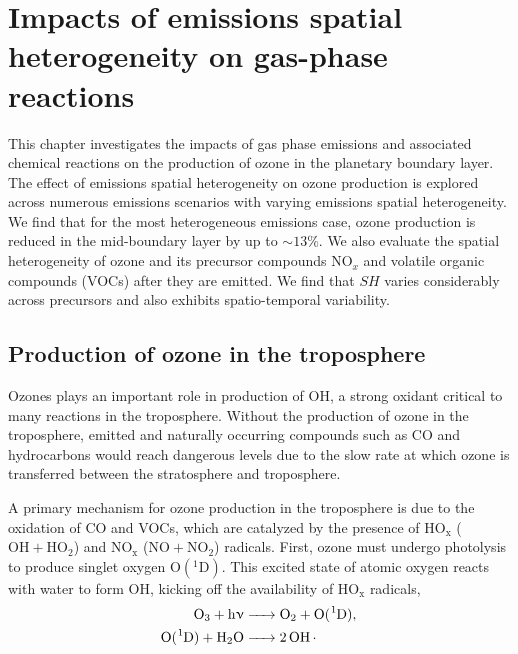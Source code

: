 \chapter{Impacts of emissions spatial heterogeneity on gas-phase reactions}

This chapter investigates the impacts of gas phase emissions and associated chemical reactions on the production of ozone in the planetary boundary layer. The effect of emissions spatial heterogeneity on ozone production is explored across numerous emissions scenarios with varying emissions spatial heterogeneity. We find that for the most heterogeneous emissions case, ozone production is reduced in the mid-boundary layer by up to $\sim13\%$. We also evaluate the spatial heterogeneity of ozone and its precursor compounds NO$_x$ and volatile organic compounds (VOCs) after they are emitted. We find that $SH$ varies considerably across precursors and also exhibits spatio-temporal variability.

\section{Production of ozone in the troposphere}

Ozones plays an important role in production of OH, a strong oxidant critical to many reactions in the troposphere. Without the production of ozone in the troposphere, emitted and naturally occurring compounds such as CO and hydrocarbons would reach dangerous levels due to the slow rate at which ozone is transferred between the stratosphere and troposphere. 

A primary mechanism for ozone production in the troposphere is due to the oxidation of CO and VOCs, which are catalyzed by the presence of HO$_\text{x}$ ($\text{OH} + \text{HO}_2$) and NO$_\text{x}$ ($\text{NO} + \text{NO}_2$) radicals. First, ozone must undergo photolysis to produce singlet oxygen O$(^1\text{D})$. This excited state of atomic oxygen reacts with water to form OH, kicking off the availability of HO$_\text{x}$ radicals,  
\begin{align}
    \ce{
    O_3 + h\nu &-> O_2 + O(^1D), \\ 
    O(^1D) + H_2O&-> 2OH. 
       }
\end{align}

